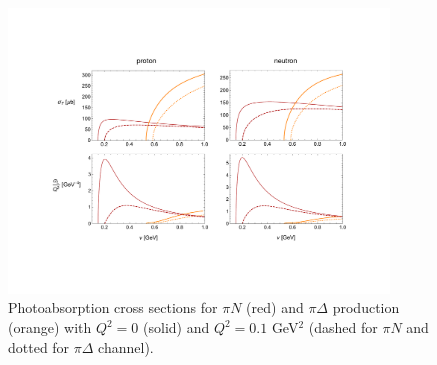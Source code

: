 \documentclass[12pt,preprint,tightenlines,
showpacs,preprintnumbers,amsmath,amssymb,
a4paper,nofootinbib]{revtex4-2}
\begin{document}
\begin{figure}[tbh]
\begin{center} 
\includegraphics[width=0.9\textwidth]{UnpolarizedCrossSections.pdf}
\caption{\small{Photoabsorption cross sections for $\pi N$ (red) and $\pi \Delta$ production (orange) with $Q^2=0$ (solid) and $Q^2=0.1$ GeV$^2$ (dashed for $\pi N$ and dotted for $\pi \Delta$ channel). \label{Fig:SummaryCrossSections}}}
\end{center}
\end{figure}
\end{document}
